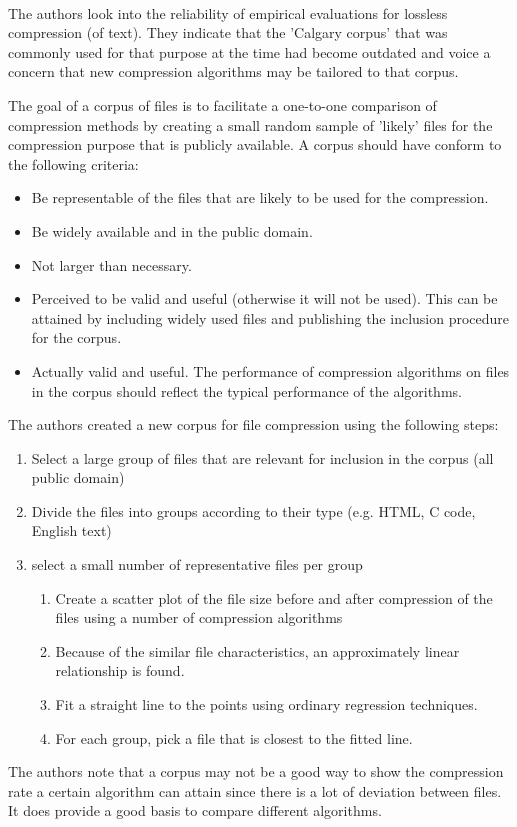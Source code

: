 \cite{arnold1997corpus}\\
The authors  look into the reliability of empirical evaluations for lossless compression (of text). They indicate that the 'Calgary corpus' that was commonly used for that purpose at the time had become outdated and voice a concern that new compression algorithms may be tailored to that corpus. 

The goal of a corpus of files is to facilitate a one-to-one comparison of compression methods by creating a small random sample of 'likely' files for the compression purpose that is publicly available. A corpus should have conform to the following criteria:
\begin{itemize}
\item Be representable of the files that are likely to be used for the compression.
\item Be widely available and in the public domain.
\item Not larger than necessary.
\item Perceived to be valid and useful (otherwise it will not be used). This can be attained by including widely used files and publishing the inclusion procedure for the corpus.
\item Actually valid and useful. The performance of compression algorithms on files in the corpus should reflect the typical performance of the algorithms.
\end{itemize}

The authors created a new corpus for file compression using the following steps:
\begin{enumerate}
\item Select a large group of files that are relevant for inclusion in the corpus (all public domain)
\item Divide the files into groups according to their type (e.g. HTML, C code, English text)
\item select a small number of representative files per group 
\begin{enumerate}
\item Create a scatter plot of the file size before and after compression of the files using a number of compression algorithms
\item Because of the similar file characteristics, an approximately linear relationship is found.
\item Fit a straight line to the points using ordinary regression techniques.
\item For each group, pick a file that is closest to the fitted line.
\end{enumerate}
\end{enumerate}

The authors note that a corpus may not be a good way to show the compression rate a certain algorithm can attain since there is a lot of deviation between files. It does provide a good basis to compare different algorithms.
\\
